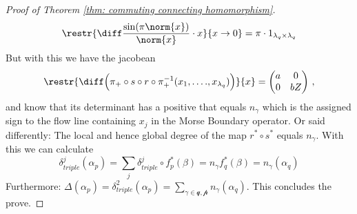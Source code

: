 \begin{proof}[Proof of Theorem \ref{thm: commuting connecting homomorphism}]
		\begin{equation*}
			\restr{\diff \frac{\sin(\pi\norm{x})}{\norm{x}}\cdot x}{x\to 0}=\pi\cdot 1_{\lambda_q\times \lambda_q}
		\end{equation*} But with this we have the jacobean 
		\begin{equation*}
			\restr{\diff \Big( \pi_+\circ s\circ r\circ \pi_+^{-1}(x_1,\dots .,x_{\lambda_q})\Big)}{x}=\begin{pmatrix}
				a&0\\
				0&bZ
			\end{pmatrix}\,,
		\end{equation*} and know that its determinant has a positive that equals $n_{\gamma}$ which is the assigned sign to the flow line containing $x_j$ in the Morse Boundary operator. Or said differently: The local and hence global degree of the map $r^*\circ s^*$ equals $n_\gamma$. With this we can calculate 
		\begin{equation*}
			\delta^j_{triple}(\alpha_p)=\sum_{j}\delta^j_{triple}\circ f_p^*(\beta)=n_{\gamma}f^*_q(\beta)=n_\gamma(\alpha_q)
		\end{equation*}
		Furthermore: $\Delta(\alpha_p)=\delta^2_{triple}(\alpha_p)=\sum_{\gamma \in \mathcal{q,p}} n_\gamma(\alpha_q)$. This concludes the prove. 
	\end{proof}
